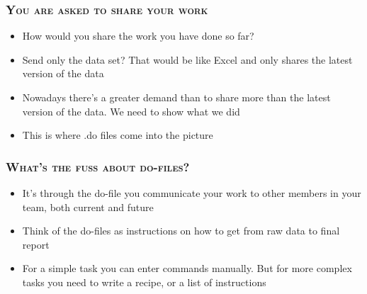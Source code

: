 \documentclass[10pt]{beamer}
\begin{document}
	\begin{frame}
		\frametitle{\textsc{You are asked to share your work}}

		\begin{itemize}
			\item How would you share the work you have done so far?
			\item Send only the data set? That would be like Excel and only shares the latest version of the data
			\item Nowadays there's a greater demand than to share more than the latest version of the data. We need to show what we did
			\item This is where .do files come into the picture

		\end{itemize}
	\end{frame}

		\begin{frame}
			\frametitle{\textsc{What's the fuss about do-files?}}
			
			\begin{itemize}
				\item It's through the do-file you communicate your work to other members in your team, both current and future
				\item Think of the do-files as instructions on how to get from raw data to final report
				\item For a simple task you can enter commands manually. But for more complex tasks you need to write a recipe, or a list of instructions
				
				\end{itemize}
			\end{frame}
			
\end{document}
